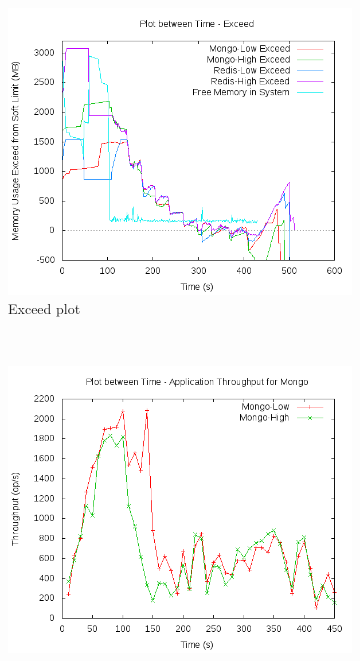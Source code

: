       \begin{figure}[t!]
	  \centering
	  \begin{subfigure}[t]{0.48\textwidth}
	    \centering
	    \includegraphics[width=1\textwidth]{images/controller_issues/derivative/complete.png}
	    \caption{Exceed plot}
	    \label{plot_inference_complete}
	  \end{subfigure}
	  ~ 
	  \begin{subfigure}[t]{0.48\textwidth}
	    \centering
	    \includegraphics[width=1\textwidth]{images/controller_issues/derivative/complete_mongo.png}

\end{subfigure}
\end{figure}
